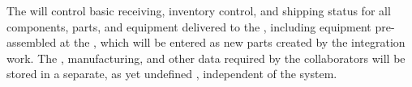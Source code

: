 The  will control basic receiving, inventory control, and shipping status for all components, parts, and equipment delivered to the , including equipment  pre-assembled at the , which will be entered  as new parts created by the integration work. The , %
 manufacturing, and other %
data required by the  collaborators will be stored in a separate, as yet undefined  %
, independent of the  system. 

